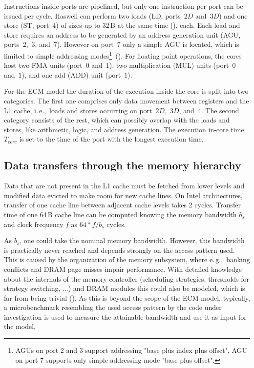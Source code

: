 Instructions inside ports are pipelined, but only one instruction per port can
be issued per cycle.
Haswell can perform two loads (LD, ports~$2D$ and~$3D$) and one store (ST,
port~$4$) of sizes up to $32$\,B at the same time (\cite{intel-orm-2016}), each.
Each load and store requires an address to be generated by an address
generation unit (AGU, ports~$2$,~$3$, and~$7$).
However on port~$7$ only a simple AGU is located, which is limited to simple
addressing modes\footnote{AGUs on port 2 and 3 support addressing "base plus index plus offset", AGU on port 7 supports only simple addressing mode "base plus offset".}~(\cite{intel-orm-2016,hofmann-2016-hsw}).
%
For floating point operations, the cores host two 
FMA units (port~$0$ and~$1$), two multiplication (MUL) units (port~$0$
and~$1$), and one add (ADD) unit (port~$1$).

For the ECM model the duration of the execution inside the core is split into
two categories.
The first one comprises only data movement between registers and the L1 cache,
i.\,e.,\ loads and stores occurring on port~$2D$,~$3D$, and~$4$.
The second category consists of the rest, which can possibly overlap with the
loads and stores, like arithmetic, logic, and address generation.
The execution in-core time $T_{core}$ is set to the time of the port with the longest execution time.

\subsection*{Data transfers through the memory hierarchy}

Data that are not present in the L1 cache must be fetched from lower levels and modified data evicted to make room for new cache lines.
On Intel architectures, transfer of one cache line between adjacent cache levels takes 2 cycles.
Transfer time of one 64\,B cache line can be computed knowing the memory bandwidth $b_s$ and clock frequency $f$ as $64*f/b_s$ cycles.

As $b_s$, one could take the nominal memory bandwidth.
However, this bandwidth is practically never reached and depends strongly on the
access pattern used.
This is caused by the organization of the memory subsystem, where e.\,g.,\ banking
conflicts and DRAM page misses impair performance.
With detailed knowledge about the internals of the memory controller
(scheduling strategies, thresholds for strategy switching, ...) and DRAM modules
this could also be modeled, which is far from being trivial (\cite{jacob-2007}).
As this is beyond the scope of the ECM model, typically, a microbenchmark
resembling the used access pattern by the code under investigation is used
to measure the attainable bandwidth and use it as input for the model.


